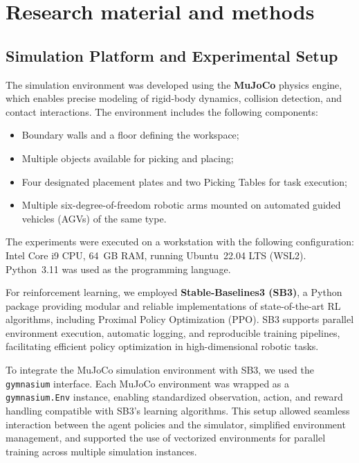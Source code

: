\documentclass[english, 12pt, a4paper, elec, utf8, a-2b, online]{aaltothesis}
\begin{document}
\clearpage

\section{Research material and methods}

\subsection{Simulation Platform and Experimental Setup}

The simulation environment was developed using the \textbf{MuJoCo} physics engine, which enables precise modeling of rigid-body dynamics, collision detection, and contact interactions. The environment includes the following components:
\begin{itemize}
    \item Boundary walls and a floor defining the workspace;
    \item Multiple objects available for picking and placing;
    \item Four designated placement plates and two Picking Tables for task execution;
    \item Multiple six-degree-of-freedom robotic arms mounted on automated guided vehicles (AGVs) of the same type.

\end{itemize}


The experiments were executed on a workstation with the following configuration: Intel Core i9 CPU, 64~GB RAM, running Ubuntu~22.04 LTS (WSL2). Python~3.11 was used as the programming language. 

For reinforcement learning, we employed \textbf{Stable-Baselines3 (SB3)}, a Python package providing modular and reliable implementations of state-of-the-art RL algorithms, including Proximal Policy Optimization (PPO). SB3 supports parallel environment execution, automatic logging, and reproducible training pipelines, facilitating efficient policy optimization in high-dimensional robotic tasks.

To integrate the MuJoCo simulation environment with SB3, we used the \texttt{gymnasium} interface. Each MuJoCo environment was wrapped as a \texttt{gymnasium.Env} instance, enabling standardized observation, action, and reward handling compatible with SB3's learning algorithms. This setup allowed seamless interaction between the agent policies and the simulator, simplified environment management, and supported the use of vectorized environments for parallel training across multiple simulation instances.
\end{document}
